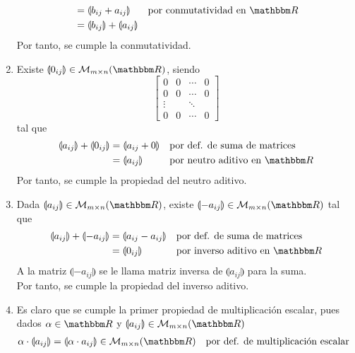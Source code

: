 \begin{theorem}
\begin{enumerate}[label=\roman*)]
\begin{align*}
            & = \llparenthesis b_{ij} + a_{ij} \rrparenthesis && \text{por conmutatividad en $\RR$} \\
            & = \llparenthesis b_{ij} \rrparenthesis + \llparenthesis a_{ij} \rrparenthesis
        \end{align*}
        Por tanto, se cumple la conmutatividad.
        \item Existe $\llparenthesis 0_{ij} \rrparenthesis \in \matrizmn$, siendo
        $$\begin{bmatrix}
            0 & 0 & \cdots & 0 \\
            0 & 0 & \cdots & 0 \\
            \vdots &  & \ddots & \\
            0 & 0 & \cdots & 0
        \end{bmatrix}$$
        tal que
        \begin{align*}
            \llparenthesis a_{ij} \rrparenthesis + \llparenthesis 0_{ij} \rrparenthesis & = \llparenthesis a_{ij} + 0 \rrparenthesis && \text{por def. de suma de matrices} \\
            & = \llparenthesis a_{ij} \rrparenthesis && \text{por neutro aditivo en $\RR$}
        \end{align*}
        Por tanto, se cumple la propiedad del neutro aditivo.
        \item Dada $\llparenthesis a_{ij} \rrparenthesis \in \matrizmn$, existe $\llparenthesis - a_{ij} \rrparenthesis \in \matrizmn$ tal que
        \begin{align*}
            \llparenthesis a_{ij} \rrparenthesis + \llparenthesis - a_{ij} \rrparenthesis & = \llparenthesis a_{ij} -a_{ij} \rrparenthesis && \text{por def. de suma de matrices} \\
            & = \llparenthesis 0_{ij} \rrparenthesis && \text{por inverso aditivo en $\RR$}
        \end{align*}
        A la matriz $\llparenthesis -a_{ij} \rrparenthesis$ se le llama matriz inversa de $\llparenthesis a_{ij} \rrparenthesis$ para la suma. \\
        Por tanto, se cumple la propiedad del inverso aditivo.
        \item Es claro que se cumple la primer propiedad de multiplicación escalar, pues dados $\alpha \in \RR$ y $\llparenthesis a_{ij} \rrparenthesis \in \matrizmn$
        \begin{align*}
            \alpha \cdot \llparenthesis a_{ij} \rrparenthesis & = \llparenthesis \alpha \cdot a_{ij} \rrparenthesis \in \matrizmn && \text{por def. de multiplicación escalar}

\end{align*}
\end{enumerate}
\end{theorem}
